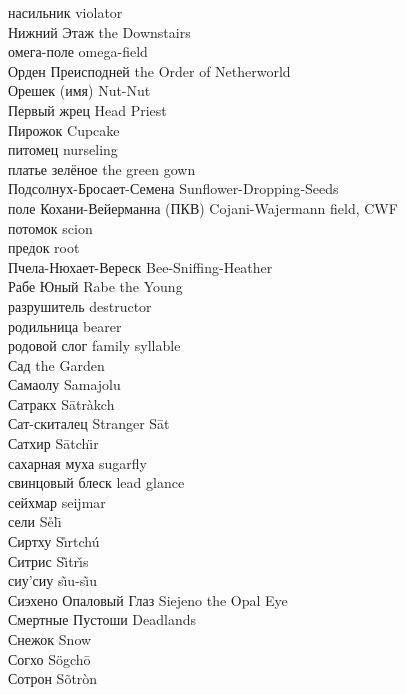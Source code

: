 насильник \hfill violator\\
Нижний Этаж \hfill the Downstairs\\
омега-поле \hfill omega-field\\
Орден Преисподней \hfill the Order of Netherworld\\
Орешек (имя) \hfill Nut-Nut\\
Первый жрец \hfill Head Priest\\
Пирожок \hfill Cupcake\\
питомец \hfill nurseling\\
платье зелёное \hfill the green gown\\
Подсолнух-Бросает-Семена \hfill Sunflower-Dropping-Seeds\\
поле Кохани-Вейерманна (ПКВ) \hfill Cojani-Wajermann field, CWF\\
потомок \hfill scion\\
предок \hfill root\\
Пчела-Нюхает-Вереск \hfill Bee-Sniffing-Heather\\
Рабе Юный \hfill Rabe the Young\\
разрушитель \hfill destructor\\
родильница \hfill bearer\\
родовой слог \hfill family syllable\\
Сад \hfill the Garden\\
Самаолу \hfill Samajolu\\
Сатракх \hfill S\={a}tr\`{a}kch\\
Сат-скиталец \hfill Stranger S\={a}t\\
Сатхир \hfill S\={a}tch\"{\i}r\\
сахарная муха \hfill sugarfly\\
свинцовый блеск \hfill lead glance\\
сейхмар \hfill seijmar\\
сели \hfill S\r{e}l\={\i}\\
Сиртху \hfill S\r{\i}rtch\'{u}\\
Ситрис \hfill S\~{\i}tr\v{\i}s\\
сиу'сиу \hfill s\~{\i}u-s\~{\i}u\\
Сиэхено Опаловый Глаз \hfill Siejeno the Opal Eye\\
Смертные Пустоши \hfill Deadlands\\
Снежок \hfill Snow\\
Согхо \hfill S\"{o}gch\={o}\\
Сотрон \hfill S\~{o}tr\`{o}n\\
